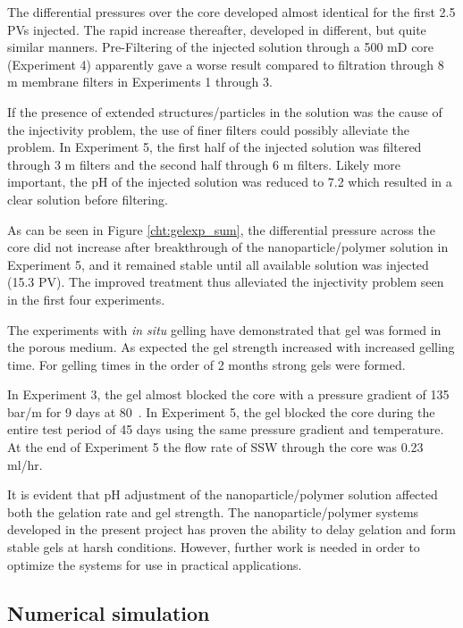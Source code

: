 \documentclass[nanomaterials,article,submit,moreauthors,pdftex]{Definitions/mdpi}
\begin{document}
The differential pressures over the core developed almost identical for the first 2.5 PVs injected. The rapid increase thereafter, developed in different, but quite similar manners. Pre-Filtering of the injected solution through a 500 mD core (Experiment 4) apparently gave a worse result compared to filtration through 8 \micro m membrane filters in Experiments 1 through 3.

If the presence of extended structures/particles in the solution was the cause of the injectivity problem, the use of finer filters could possibly alleviate the problem. In Experiment 5, the first half of the injected solution was filtered through 3 \micro m filters and the second half through 6 \micro m filters. Likely more important, the pH of the injected solution was reduced to 7.2 which resulted in a clear solution before filtering. 

As can be seen in Figure \ref{cht:gelexp_sum}, the differential pressure across the core did not increase after breakthrough of the nanoparticle/polymer solution in Experiment 5, and it remained stable until all available solution was injected (15.3 PV). The improved treatment thus alleviated the injectivity problem seen in the first four experiments.

The experiments with \textit{in situ} gelling have demonstrated that gel was formed in the porous medium. As expected the gel strength increased with increased gelling time. For gelling times in the order of 2 months strong gels were formed. 

In Experiment 3, the gel almost blocked the core with a pressure gradient of 135 bar/m for 9 days at 80~\celsius. In Experiment 5, the gel blocked the core during the entire test period of 45 days using the same pressure gradient and temperature. At the end of Experiment 5 the flow rate of SSW through the core was 0.23 ml/hr. 

It is evident that pH adjustment of the nanoparticle/polymer solution affected both the gelation rate and gel strength. The nanoparticle/polymer systems developed in the present project has proven the ability to delay gelation and form stable gels at harsh conditions. However, further work is needed in order to optimize the systems for use in practical applications. 

\subsection{Numerical simulation}
\end{document}
